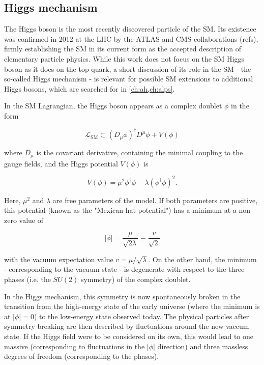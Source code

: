 \subsection{Higgs mechanism}
\label{sec:theory:higgs}

The Higgs boson is the most recently discovered particle of the SM. Its existence was confirmed in 2012 at the LHC by the ATLAS and CMS collaborations (refs), firmly establishing the SM in its current form as the accepted description of elementary particle physics. While this work does not focus on the SM Higgs boson as it does on the top quark, a short discussion of its role in the SM - the so-called Higgs mechanism - is relevant for possible SM extensions to additional Higgs bosons, which are searched for in \cref{ch:ah,ch:alps}.

In the SM Lagrangian, the Higgs boson appears as a complex doublet $\phi$ in the form

\begin{equation}
    \mathcal{L}_{\mathrm{SM}} \subset \left(D_\mu \phi\right)^\dagger D^\mu \phi + V(\phi)
\end{equation}

\noindent where $D_\mu$ is the covariant derivative, containing the minimal coupling to the gauge fields, and the Higgs potential $V(\phi)$ is 

\begin{equation}
    V(\phi) = \mu^2 \phi^\dagger \phi - \lambda (\phi^\dagger \phi)^2 .
\end{equation}

Here, $\mu^2$ and $\lambda$ are free parameters of the model. If both parameters are positive, this potential (known as the "Mexican hat potential") has a minimum at a non-zero value of

\begin{equation}
    | \phi | = \frac{\mu}{\sqrt{2 \lambda}} \equiv \frac{v}{\sqrt{2}}
\end{equation}

\noindent with the vacuum expectation value $v = \mu / \sqrt{\lambda}$. On the other hand, the minimum - corresponding to the vacuum state - is degenerate with respect to the three phases (i.e. the $SU(2)$ symmetry) of the complex doublet.

In the Higgs mechanism, this symmetry is now spontaneously broken in the transition from the high-energy state of the early universe (where the minimum is at $|\phi| = 0$) to the low-energy state observed today. The physical particles after symmetry breaking are then described by fluctuations around the new vaccum state. If the Higgs field were to be considered on its own, this would lead to one massive (corresponding to fluctuations in the $|\phi|$ direction) and three massless degrees of freedom (corresponding to the phases).

